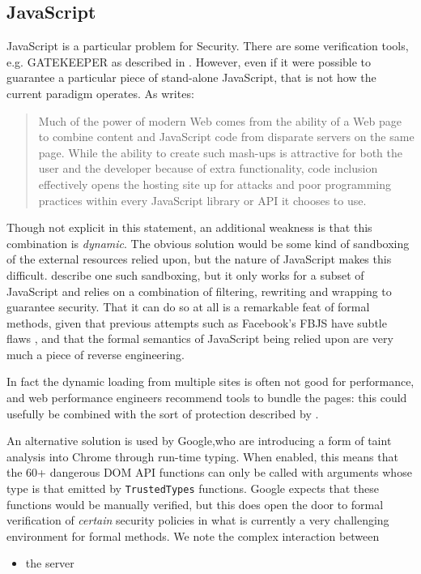 \documentclass{llncs}
\begin{document}
\subsection{JavaScript}
JavaScript is a particular problem for Security. There are some verification tools, e.g. GATEKEEPER as described in \cite{GuarnieriLivshits2009}. However, even if it were possible to guarantee a particular piece of stand-alone JavaScript, that is not how the current paradigm operates. As \cite{MeyerovichLivshits2010a} writes:
\begin{quote}
Much of the power of modern Web comes from the
ability of a Web page to combine content and JavaScript code
from disparate servers on the same page. While the ability
to create such mash-ups is attractive for both the user and
the developer because of extra functionality, code inclusion
effectively opens the hosting site up for attacks and poor
programming practices within every JavaScript library or API
it chooses to use.
\end{quote}
Though not explicit in this statement, an additional weakness is that this combination is \emph{dynamic}.
The obvious solution would be some kind of sandboxing of the external resources relied upon, but the nature of JavaScript makes this difficult.  \cite{Maffeisetal2009} describe one such sandboxing, but it only works for a subset of JavaScript and relies on a combination of filtering, rewriting and wrapping to guarantee security. That it can do so at all is a remarkable feat of formal methods, given that previous attempts such as Facebook's FBJS have subtle flaws \cite{MaffeisTaly2009}, and that the formal semantics of JavaScript being relied upon are very much a piece of reverse engineering.
\par
In fact the dynamic loading from multiple sites is often not good for performance, and web performance engineers recommend tools to bundle the pages: this could usefully be combined with the sort of protection described by \cite{Maffeisetal2009}.
\par
An alternative solution is used by Google,who are introducing a form of taint analysis into Chrome \cite{Kotowicz2019a} through run-time typing. When enabled, this means that the 60+ dangerous DOM API functions can only be called with arguments whose type is that emitted by \verb+TrustedTypes+ functions. Google expects that these functions would be manually verified, but this does open the door to formal verification of \emph{certain} security policies in what is currently a very challenging environment for formal methods. We note the complex interaction between
\begin{itemize}
\item the  server
\end{itemize}
\end{document}
